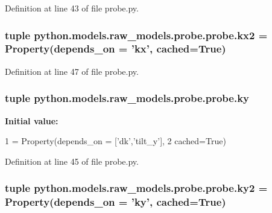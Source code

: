 Definition at line 43 of file probe.\-py.

\hypertarget{classpython_1_1models_1_1raw__models_1_1probe_1_1probe_a594849df4a81252e0c55d4d442bf9d96}{
\subsubsection[{kx2}]{\setlength{\rightskip}{0pt plus 5cm}tuple python.\-models.\-raw\-\_\-models.\-probe.\-probe.\-kx2 = Property(depends\-\_\-on = '{\bf kx}', cached=True)\hspace{0.3cm}{\ttfamily [static]}}}\label{classpython_1_1models_1_1raw__models_1_1probe_1_1probe_a594849df4a81252e0c55d4d442bf9d96}


Definition at line 47 of file probe.\-py.

\hypertarget{classpython_1_1models_1_1raw__models_1_1probe_1_1probe_aa4267b1a4f563355ed7a424d4c0e8995}{
\subsubsection[{ky}]{\setlength{\rightskip}{0pt plus 5cm}tuple python.\-models.\-raw\-\_\-models.\-probe.\-probe.\-ky\hspace{0.3cm}{\ttfamily [static]}}}\label{classpython_1_1models_1_1raw__models_1_1probe_1_1probe_aa4267b1a4f563355ed7a424d4c0e8995}
{\bfseries Initial value\-:}
\begin{DoxyCode}
1 = Property(depends\_on = [\textcolor{stringliteral}{'dk'},\textcolor{stringliteral}{'tilt\_y'}], 
2                   cached=\textcolor{keyword}{True})
\end{DoxyCode}


Definition at line 45 of file probe.\-py.

\hypertarget{classpython_1_1models_1_1raw__models_1_1probe_1_1probe_a1fff837e6a5b26f1bf093aba84e78daf}{
\subsubsection[{ky2}]{\setlength{\rightskip}{0pt plus 5cm}tuple python.\-models.\-raw\-\_\-models.\-probe.\-probe.\-ky2 = Property(depends\-\_\-on = '{\bf ky}', cached=True)\hspace{0.3cm}{\ttfamily [static]}}}\label{classpython_1_1models_1_1raw__models_1_1probe_1_1probe_a1fff837e6a5b26f1bf093aba84e78daf}


